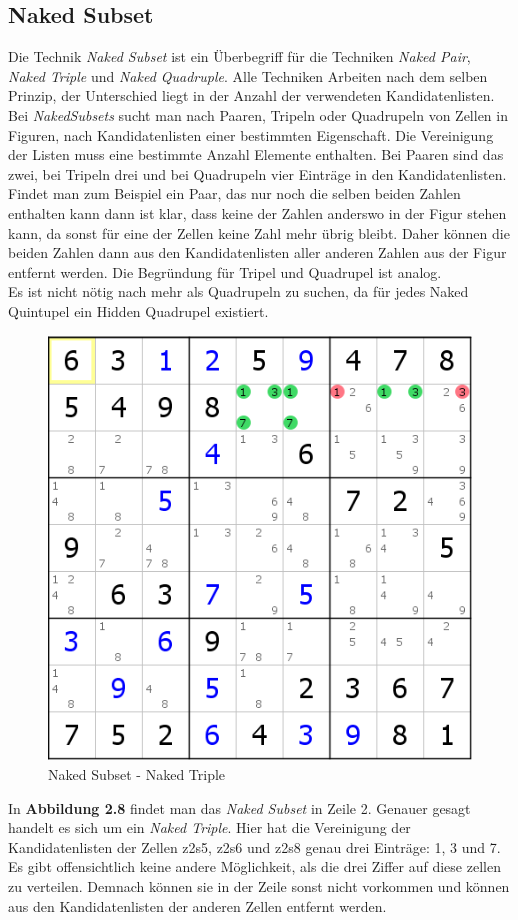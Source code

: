 \newpage
\subsection{Naked Subset}
Die Technik \textit{Naked Subset} ist ein Überbegriff für die Techniken \textit{Naked Pair}, \textit{Naked Triple} und \textit{Naked Quadruple}. Alle Techniken Arbeiten nach dem selben Prinzip, der Unterschied liegt in der Anzahl der verwendeten Kandidatenlisten. Bei \textit{NakedSubsets} sucht man nach Paaren, Tripeln oder Quadrupeln von Zellen in Figuren, nach Kandidatenlisten einer bestimmten Eigenschaft. Die Vereinigung der Listen muss eine bestimmte Anzahl Elemente enthalten. Bei Paaren sind das zwei, bei Tripeln drei und bei Quadrupeln vier Einträge in den Kandidatenlisten.\\
Findet man zum Beispiel ein Paar, das nur noch die selben beiden Zahlen enthalten kann dann ist klar, dass keine der Zahlen anderswo in der Figur stehen kann, da sonst für eine der Zellen keine Zahl mehr übrig bleibt. Daher können die beiden Zahlen dann aus den Kandidatenlisten aller anderen Zahlen aus der Figur entfernt werden.
Die Begründung für Tripel und Quadrupel ist analog.\\
Es ist nicht nötig nach mehr als Quadrupeln zu suchen, da für jedes Naked Quintupel ein Hidden Quadrupel existiert.

\begin{figure}[h]
\begin{center}
\includegraphics{./img/naked_subset.png}
\caption{Naked Subset - Naked Triple}
\end{center}
\end{figure}

In \textbf{Abbildung 2.8} findet man das \textit{Naked Subset} in Zeile 2. Genauer gesagt handelt es sich um ein \textit{Naked Triple}. Hier hat die Vereinigung der Kandidatenlisten der Zellen z2s5, z2s6 und z2s8 genau drei Einträge: 1, 3 und 7. Es gibt offensichtlich keine andere Möglichkeit, als die drei Ziffer auf diese zellen zu verteilen. Demnach können sie in der Zeile sonst nicht vorkommen und können aus den Kandidatenlisten der anderen Zellen entfernt werden.
